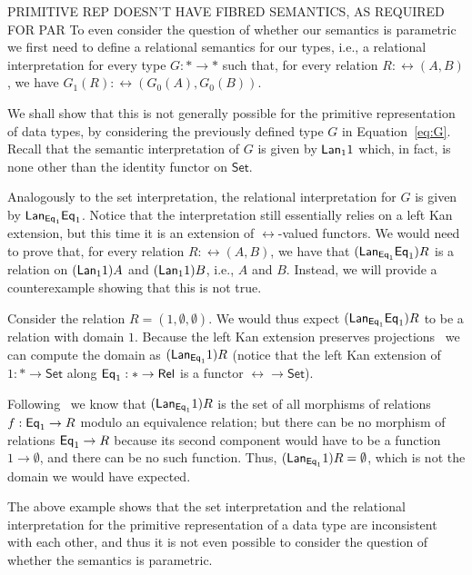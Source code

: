 \documentclass[acmsmall,screen,review,anonymous]{acmart}
\theoremstyle{definition}
\newcommand{\set}{\mathsf{Set}}
\begin{document}
\begin{example}
{\color{red} PRIMITIVE REP DOESN'T HAVE FIBRED SEMANTICS, AS REQUIRED
  FOR PAR} To
even consider the question of whether our semantics is parametric we
first need to define a relational semantics for our types, i.e., a
relational interpretation for every type $G : \ast \to \ast$ such
that, for every relation $R : \rel(A, B)$, we have $G_1(R) :
\rel(G_0(A), G_0(B))$.

We shall show that this is not generally possible for the primitive
representation of data types, by considering the previously defined
type $G$ in Equation~\ref{eq:G}.  Recall that the semantic
interpretation of $G$ is given by $\mathsf{\mathsf{Lan}}_1 1$ which, in fact,
is none other than the identity functor on $\set$.

Analogously to the set interpretation, the relational interpretation
for $G$ is given by $\mathsf{\mathsf{Lan}}_{\mathsf{Eq}_1} \mathsf{Eq}_1$.  Notice that the
interpretation still essentially relies on a left Kan extension, but
this time it is an extension of $\rel$-valued functors.  We would need
to prove that, for every relation $R : \rel(A, B)$, we have that
$(\mathsf{\mathsf{Lan}}_{\mathsf{Eq}_1} \mathsf{Eq}_1) R$ is a relation on $(\mathsf{\mathsf{Lan}}_1
1) A$ and $(\mathsf{\mathsf{Lan}}_1 1)B$, i.e., $A$ and $B$.  Instead, we will
provide a counterexample showing that this is not true.

Consider the relation $R = (1, \emptyset, \emptyset)$.  We would thus
expect $(\mathsf{\mathsf{Lan}}_{\mathsf{Eq}_1} \mathsf{Eq}_1) R$ to be a relation with domain
$1$.  Because the left Kan extension preserves
projections~\cite{rie16} we can compute the domain as
$(\mathsf{\mathsf{Lan}}_{\mathsf{Eq}_1} 1) R$ (notice that the left Kan extension of
$1 : \ast \to \set$ along $\mathsf{Eq}_1 : \ast \to \mathsf{Rel}$ is a functor $\rel
\to \set$).

Following~\cite{blw03} we know that $(\mathsf{\mathsf{Lan}}_{\mathsf{Eq}_1} 1) R$ is
the set of all morphisms of relations $f : \mathsf{Eq}_1 \to R$ modulo an
equivalence relation; but there can be no morphism of relations $\mathsf{Eq}_1
\to R$ because its second component would have to be a function $1 \to
\emptyset$, and there can be no such function.  Thus,
$(\mathsf{\mathsf{Lan}}_{\mathsf{Eq}_1} 1) R = \emptyset$, which is not the domain we
would have expected.
\end{example}

The above example shows that the set interpretation and the relational
interpretation for the primitive representation of a data type are
inconsistent with each other, and thus it is not even possible to
consider the question of whether the semantics is parametric.
\end{document}
